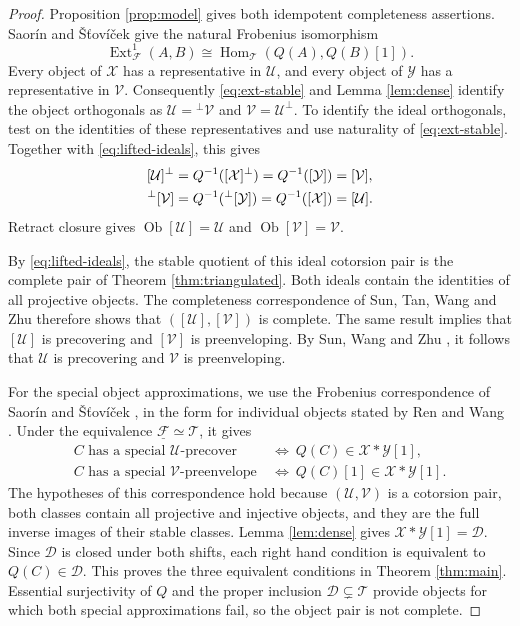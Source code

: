 \documentclass[11pt,a4paper,reqno]{amsart}
\newcommand{\Dcal}{\mathcal D}
\newcommand{\Tcal}{\mathcal T}
\newcommand{\Xcal}{\mathcal X}
\newcommand{\Hom}{\operatorname{Hom}}
\theoremstyle{plain}
\theoremstyle{definition}
\theoremstyle{remark}
\newcommand{\Fcal}{\mathcal F}
\newcommand{\Ycal}{\mathcal Y}
\newcommand{\Ucal}{\mathcal U}
\newcommand{\Vcal}{\mathcal V}
\newcommand{\Ext}{\operatorname{Ext}}
\newcommand{\Ob}{\operatorname{Ob}}
\begin{document}
\begin{proof}
Proposition \ref{prop:model} gives both idempotent completeness assertions. Saor\'in and \v{S}\v{t}ov\'i\v{c}ek \cite[Proposition~3.3 and its proof]{SS11} give the natural Frobenius isomorphism
\begin{equation}\label{eq:ext-stable}
\Ext^1_{\Fcal}(A,B)\cong\Hom_{\Tcal}(Q(A),Q(B)[1]).
\end{equation}
Every object of $\Xcal$ has a representative in $\Ucal$, and every object of $\Ycal$ has a representative in $\Vcal$. Consequently \eqref{eq:ext-stable} and Lemma \ref{lem:dense} identify the object orthogonals as $\Ucal={}^\perp\Vcal$ and $\Vcal=\Ucal^\perp$. To identify the ideal orthogonals, test on the identities of these representatives and use naturality of \eqref{eq:ext-stable}. Together with \eqref{eq:lifted-ideals}, this gives
$$
\begin{aligned}
\relax [\Ucal]^\perp
&=Q^{-1}([\Xcal]^\perp)=Q^{-1}([\Ycal])=[\Vcal],\\
{}^\perp[\Vcal]
&=Q^{-1}({}^\perp[\Ycal])=Q^{-1}([\Xcal])=[\Ucal].
\end{aligned}
$$
Retract closure gives $\Ob[\Ucal]=\Ucal$ and $\Ob[\Vcal]=\Vcal$.

By \eqref{eq:lifted-ideals}, the stable quotient of this ideal cotorsion pair is the complete pair of Theorem \ref{thm:triangulated}. Both ideals contain the identities of all projective objects. The completeness correspondence of Sun, Tan, Wang and Zhu \cite[Corollary~1.2]{STWZ25} therefore shows that $([\Ucal],[\Vcal])$ is complete. The same result implies that $[\Ucal]$ is precovering and $[\Vcal]$ is preenveloping. By Sun, Wang and Zhu \cite[Lemma~3.2(1)]{SWZ24}, it follows that $\Ucal$ is precovering and $\Vcal$ is preenveloping.

For the special object approximations, we use the Frobenius correspondence of Saor\'in and \v{S}\v{t}ov\'i\v{c}ek \cite[Proposition~3.3]{SS11}, in the form for individual objects stated by Ren and Wang \cite[Lemma~4.4]{RW26}. Under the equivalence $\underline{\Fcal}\simeq\Tcal$, it gives
$$
\begin{aligned}
C\text{ has a special }\Ucal\text{-precover}
&\ \Longleftrightarrow\ Q(C)\in\Xcal*\Ycal[1],\\
C\text{ has a special }\Vcal\text{-preenvelope}
&\ \Longleftrightarrow\ Q(C)[1]\in\Xcal*\Ycal[1].
\end{aligned}
$$
The hypotheses of this correspondence hold because $(\Ucal,\Vcal)$ is a cotorsion pair, both classes contain all projective and injective objects, and they are the full inverse images of their stable classes. Lemma \ref{lem:dense} gives $\Xcal*\Ycal[1]=\Dcal$. Since $\Dcal$ is closed under both shifts, each right hand condition is equivalent to $Q(C)\in\Dcal$. This proves the three equivalent conditions in Theorem \ref{thm:main}. Essential surjectivity of $Q$ and the proper inclusion $\Dcal\subsetneq\Tcal$ provide objects for which both special approximations fail, so the object pair is not complete.


\end{proof}
\end{document}

